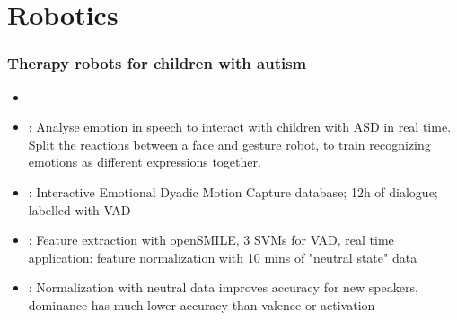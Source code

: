 \documentclass[compress,english]{beamer}
\author{Carlotta Quensel}
\begin{document}
\section{Robotics}
\begin{frame}
  \frametitle{Therapy robots for children with autism}
  \begin{itemize}
  \item {\footnotesize {}}
  \item {}: Analyse emotion in speech to interact with children with ASD in real time. Split the reactions between a face and gesture robot, to train recognizing emotions as different expressions together.
  \item {}: Interactive Emotional Dyadic Motion Capture database; 12h of dialogue; labelled with VAD 
  \item {}: Feature extraction with openSMILE, 3 SVMs for VAD, real time application: feature normalization with 10 mins of "neutral state" data
  \item {}: Normalization with neutral data improves accuracy for new speakers, dominance has much lower accuracy than valence or activation
  \end{itemize}  
\end{frame}
\end{document}
